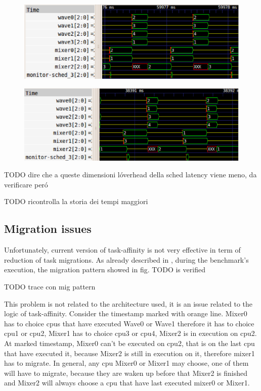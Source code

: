 \begin{figure}[htbp]
\centering
\includegraphics[width=\widefigure]{images/64KB_i7.eps}
\caption{}
\label{fig:trace_i7}
\end{figure}

\begin{figure}[htbp]
\centering
\includegraphics[width=\widefigure]{images/64KB_Xeon.eps}
\caption{}
\label{fig:trace_xeon}
\end{figure}

\newpage

TODO dire che a queste dimensioni l\'overhead della sched latency viene meno, da verificare per\'o

TODO ricontrolla la storia dei tempi maggiori 


\subsection{Migration issues}

Unfortunately, current version of task-affinity is not very effective in term of reduction of task migrations. As already described in \cite{lcs}, during 
the benchmark's execution, the migration pattern showed in fig. TODO is verified

TODO trace con mig pattern

This problem is not related to the architecture used, it is an issue related to the logic of task-affinity. Consider the timestamp marked with orange line.
Mixer0 has to choice cpus that have executed Wave0 or Wave1 therefore it has to choice cpu1 or cpu2, Mixer1 has to choice cpu3 or cpu4, Mixer2 is in 
execution on cpu2. At marked timestamp, Mixer0 can't be executed on cpu2, that is on the last cpu that have executed it, because Mixer2 is still in 
execution on it, therefore mixer1 has to migrate. In general, any cpu Mixer0 or Mixer1 may choose, one of them will have to migrate, because they are 
waken up before that Mixer2 is finished and Mixer2 will always choose a cpu that have last executed mixer0 or Mixer1. 

